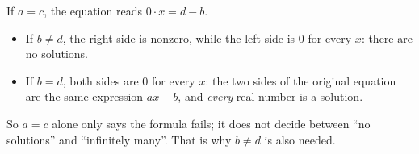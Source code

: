 If $a=c$, the equation reads $0\cdot x=d-b$.
\begin{itemize}
\item If $b\ne d$, the right side is nonzero, while the left side is $0$ for every $x$: there are no solutions.
\item If $b=d$, both sides are $0$ for every $x$: the two sides of the original equation are the same expression $ax+b$, and \emph{every} real number is a solution.
\end{itemize}
So $a=c$ alone only says the formula fails; it does not decide between ``no solutions'' and ``infinitely many''. That is why $b\ne d$ is also needed.
